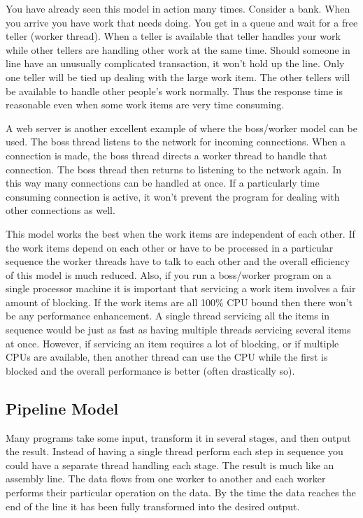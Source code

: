 You have already seen this model in action many times. Consider a bank. When you arrive you have
work that needs doing. You get in a queue and wait for a free teller (worker thread). When a
teller is available that teller handles your work while other tellers are handling other work at
the same time. Should someone in line have an unusually complicated transaction, it won't hold
up the line. Only one teller will be tied up dealing with the large work item. The other tellers
will be available to handle other people's work normally. Thus the response time is reasonable
even when some work items are very time consuming.

A web server is another excellent example of where the boss/worker model can be used. The boss
thread listens to the network for incoming connections. When a connection is made, the boss
thread directs a worker thread to handle that connection. The boss thread then returns to
listening to the network again. In this way many connections can be handled at once. If a
particularly time consuming connection is active, it won't prevent the program for dealing with
other connections as well.

This model works the best when the work items are independent of each other. If the work items
depend on each other or have to be processed in a particular sequence the worker threads have to
talk to each other and the overall efficiency of this model is much reduced. Also, if you run a
boss/worker program on a single processor machine it is important that servicing a work item
involves a fair amount of blocking. If the work items are all 100\% CPU bound then there won't
be any performance enhancement. A single thread servicing all the items in sequence would be
just as fast as having multiple threads servicing several items at once. However, if servicing
an item requires a lot of blocking, or if multiple CPUs are available, then another thread can
use the CPU while the first is blocked and the overall performance is better (often drastically
so).

\subsection{Pipeline Model}
\label{subsec:pipeline-model}

Many programs take some input, transform it in several stages, and then output the result.
Instead of having a single thread perform each step in sequence you could have a separate thread
handling each stage. The result is much like an assembly line. The data flows from one worker to
another and each worker performs their particular operation on the data. By the time the data
reaches the end of the line it has been fully transformed into the desired output.

